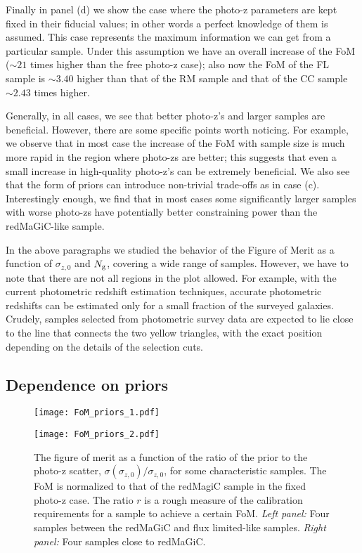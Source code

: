 \documentclass[a4paper,fleqn,usenatbib]{mnras}
\begin{document}
Finally in panel (d) we show the case where the photo-z parameters are kept fixed in their fiducial values; in other words a perfect knowledge of them is assumed. This case represents the maximum information we can get from a particular sample. Under this assumption we have an overall increase of the FoM ($\sim 21$ times higher than the free photo-z case); also now the FoM of the FL sample is $\sim 3.40$ higher than that of the RM sample and that of the CC sample $\sim 2.43$ times higher.

Generally, in all cases, we see that better photo-z's and larger samples are beneficial. However, there are some specific points worth noticing. For example, we observe that in most case the increase of the FoM with sample size is much more rapid in the region where photo-zs are better; this suggests that even a small increase in high-quality photo-z's can be extremely beneficial. We also see that the form of priors can introduce non-trivial trade-offs as in case (c). Interestingly enough, we find that in most cases some significantly larger samples with worse photo-zs have potentially better constraining power than the redMaGiC-like sample.

In the above paragraphs we studied the behavior of the Figure of Merit as a function of $\sigma_{z,0}$ and $N_{\mbox{\scriptsize{g}}}$, covering a wide range of samples. However, we have to note that there are not all regions in the plot allowed. For example, with the current photometric redshift estimation techniques,  accurate photometric redshifts can be estimated only for a small fraction  of the surveyed galaxies. Crudely, samples selected from photometric survey data are expected to lie close to the line that connects the two yellow triangles, with the exact position depending on the details of the selection cuts. 


\subsection{Dependence on priors}
\label{subsec: Depend_on_priors}

\begin{figure*}
\centering
\begin{multicols}{2}
\texttt{[image: FoM\_priors\_1.pdf]}\par 
\texttt{[image: FoM\_priors\_2.pdf]}\par 
\end{multicols}
\caption{The figure of merit as a function of the ratio of the prior to the photo-z scatter, $\sigma(\sigma_{z,0})/\sigma_{z,0}$, for some characteristic samples. The FoM is normalized to that of the redMagiC sample in the fixed photo-z case. The ratio $r$ is a rough measure of the calibration requirements for a sample to achieve a certain FoM. \textit{Left panel:} Four samples between the redMaGiC and flux limited-like samples. \textit{Right panel:} Four samples close to redMaGiC.}
\label{fig: Priors_baseline}
\end{figure*}
\end{document}
